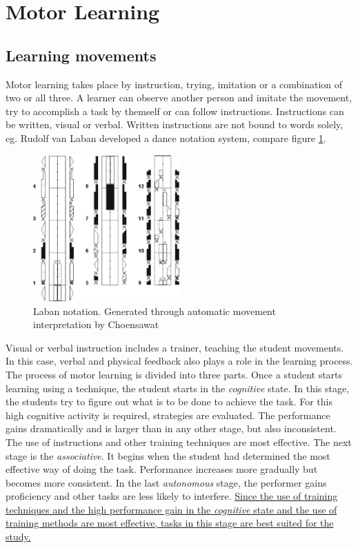 \section{Motor Learning}
\subsection{Learning movements}
Motor learning takes place by instruction, trying, imitation or a combination of two or all three. A learner can observe another person and imitate the movement, try to accomplish a task by themself or can follow instructions. Instructions can be written, visual or verbal. Written instructions are not bound to words solely, eg. Rudolf van Laban developed a dance notation system, compare figure \ref{fig:laban}.
\begin{figure}
	\centering
	\includegraphics[width=0.5\textwidth]{img/laban.png}
	\caption{Laban notation. Generated through automatic movement interpretation by Choensawat \cite{Choensawat2015}}
	\label{fig:laban}
\end{figure}
Visual or verbal instruction includes a trainer, teaching the student movements. In this case, verbal and physical feedback also plays a role in the learning process. The process of motor learning is divided into three parts. Once a student starts learning using a technique, the student starts in the \textit{cognitive} state. In this stage, the students try to figure out what is to be done to achieve the task. For this high cognitive activity is required, strategies are evaluated. The performance gains dramatically and is larger than in any other stage, but also inconsistent. The use of instructions and other training techniques are most effective. The next stage is the \textit{associative}. It begins when the student had determined the most effective way of doing the task. Performance increases more gradually but becomes more consistent. In the last \textit{autonomous} stage, the performer gains proficiency and other tasks are less likely to interfere. \ul{Since the use of training techniques and the high performance gain in the \textit{cognitive} state and the use of training methods are most effective, tasks in this stage are best suited for the study.}\\

